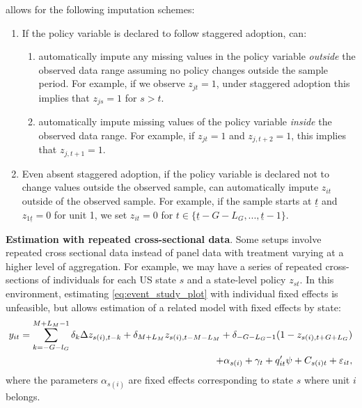 \documentclass[bib]{./sty/statapress}
\begin{document}
\xtevent allows for the following imputation schemes:
\begin{enumerate}
\item If the policy variable is declared to follow staggered adoption, \xtevent can:
\begin{enumerate}
\item automatically impute any missing values in the policy variable \textit{outside} the observed data range assuming no policy changes outside the sample period.
For example, if we observe $z_{jt}=1$, under staggered adoption this implies that $z_{js}=1$ for $s>t$.
\item automatically impute missing values of the policy variable \textit{inside} the observed data range. For example, if $z_{jt} = 1$ and $z_{j,t+2} = 1$, this implies that $z_{j,t+1} = 1$.
\end{enumerate}
\item
Even absent staggered adoption, if the policy variable is declared not to change values outside the observed sample, \xtevent can automatically impute $z_{it}$ outside of the observed sample.
For example, if the sample starts at $\underline{t}$ and $z_{1\underline{t}} = 0$ for unit 1, we set $z_{it} = 0$ for $t \in \{ \underline{t} - G - L_G, ..., \underline{t}-1 \}$.
\end{enumerate}

\noindent \textbf{Estimation with repeated cross-sectional data}. Some setups involve repeated cross sectional data instead of panel data with treatment varying at a higher level of aggregation. For example, we may have a series of repeated cross-sections of individuals for each US state $s$ and a state-level policy $z_{st}$. In this environment, estimating \eqref{eq:event_study_plot} with individual fixed effects is unfeasible, but \xtevent allows estimation of a related model with fixed effects by state:
\begin{equation}\label{eq:repeatedcs}
    \begin{split}
        y_{it} = \sum_{k=-G-l_G}^{M+L_M -1}\delta_k \Delta  z_{s(i),t-k} + \delta_{M+L_M} z_{s(i),t-M-L_M} + \delta_{-G-L_G-1}(1-z_{s(i),t+G+L_G})
        \\ \centering
        + \alpha_{s(i)} + \gamma_{t} + q'_{it}\psi + C_{s(i)t} + \varepsilon_{it},
    \end{split}
\end{equation}
where the parameters $\alpha_{s(i)}$ are fixed effects corresponding to state $s$ where unit $i$ belongs.
\end{document}
